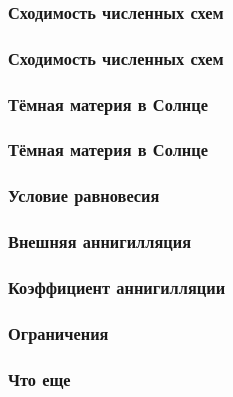 	
	\begin{frame}
		\frametitle{Сходимость численных схем}
		
	\end{frame}
	\begin{frame}
		\frametitle{Сходимость численных схем}
		
	\end{frame}
	
	\begin{frame}
		\frametitle{Тёмная материя в Солнце}
		
	\end{frame}
	\begin{frame}
		\frametitle{Тёмная материя в Солнце}
		
	\end{frame}
	
	\begin{frame}
		\frametitle{Условие равновесия}
		
	\end{frame}
	
	\begin{frame}
		\frametitle{Внешняя аннигилляция}
		
	\end{frame}
	
	\begin{frame}
		\frametitle{Коэффициент аннигилляции}
		
	\end{frame}
	
	\begin{frame}
		\frametitle{Ограничения}
		
	\end{frame}
	
	\begin{frame}
		\frametitle{Что еще}
		
	\end{frame}
 

